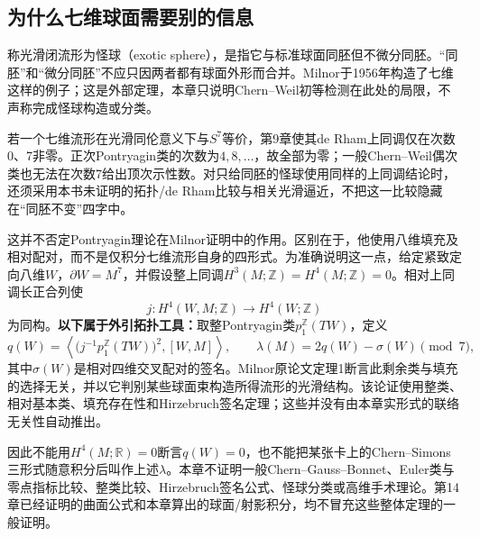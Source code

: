 \subsection{为什么七维球面需要别的信息}
称光滑闭流形为怪球（exotic sphere），是指它与标准球面同胚但不微分同胚。“同胚”和“微分同胚”不应只因两者都有球面外形而合并。Milnor于1956年构造了七维这样的例子；这是外部定理，本章只说明Chern--Weil初等检测在此处的局限，不声称完成怪球构造或分类。

若一个七维流形在光滑同伦意义下与$S^7$等价，第9章使其de Rham上同调仅在次数0、7非零。正次Pontryagin类的次数为$4,8,\ldots$，故全部为零；一般Chern--Weil偶次类也无法在次数7给出顶次示性数。对只给同胚的怪球使用同样的上同调结论时，还须采用本书未证明的拓扑/de Rham比较与相关光滑逼近，不把这一比较隐藏在“同胚不变”四字中。

这并不否定Pontryagin理论在Milnor证明中的作用。区别在于，他使用八维填充及相对配对，而不是仅积分七维流形自身的四形式。为准确说明这一点，给定紧致定向八维$W$，$\partial W=M^7$，并假设整上同调$H^3(M;\mathbb Z)=H^4(M;\mathbb Z)=0$。相对上同调长正合列使
\[
 j:H^4(W,M;\mathbb Z)\longrightarrow H^4(W;\mathbb Z)
\]
为同构。\textbf{以下属于外引拓扑工具：}取整Pontryagin类$p_1^{\mathbb Z}(TW)$，定义
\[
 q(W)=\left\langle\bigl(j^{-1}p_1^{\mathbb Z}(TW)\bigr)^2,[W,M]\right\rangle,
 \qquad\lambda(M)=2q(W)-\sigma(W)\pmod7,
\]
其中$\sigma(W)$是相对四维交叉配对的签名。Milnor原论文定理1断言此剩余类与填充的选择无关，并以它判别某些球面束构造所得流形的光滑结构。该论证使用整类、相对基本类、填充存在性和Hirzebruch签名定理；这些并没有由本章实形式的联络无关性自动推出。

因此不能用$H^4(M;\mathbb R)=0$断言$q(W)=0$，也不能把某张卡上的Chern--Simons三形式随意积分后叫作上述$\lambda$。本章不证明一般Chern--Gauss--Bonnet、Euler类与零点指标比较、整类比较、Hirzebruch签名公式、怪球分类或高维手术理论。第14章已经证明的曲面公式和本章算出的球面/射影积分，均不冒充这些整体定理的一般证明。
